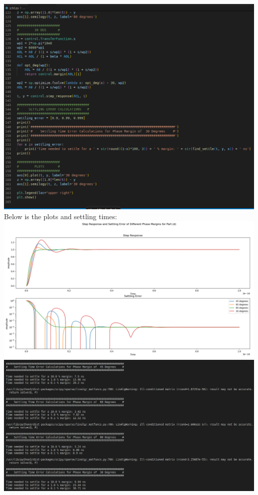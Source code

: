 \documentclass[12pt, fleqn]{article}
\begin{document}
\begin{enumerate}[label=(\alph*)]
{        \includegraphics[scale=0.3, center]{p3d_code4.PNG}\\[0.25cm]
        \newpage
        Below is the plots and settling times:\\[0.25cm]
        \includegraphics[scale=0.35, center]{p3d_plot.PNG}\\[0.25cm]
        \includegraphics[scale=0.425, center]{p3d_settle.PNG}\\[0.25cm]
}
\end{enumerate}
\end{document}
